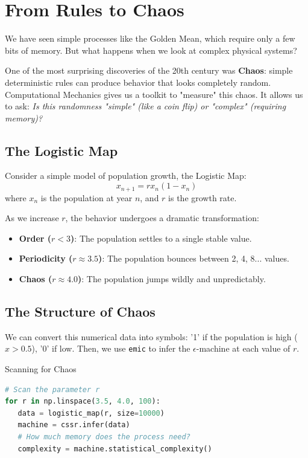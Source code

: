 \section{From Rules to Chaos}
\label{sec:chaos}

We have seen simple processes like the Golden Mean, which require only a few bits of memory. But what happens when we look at complex physical systems?

One of the most surprising discoveries of the 20th century was \textbf{Chaos}: simple deterministic rules can produce behavior that looks completely random. Computational Mechanics gives us a toolkit to "measure" this chaos. It allows us to ask: \textit{Is this randomness "simple" (like a coin flip) or "complex" (requiring memory)?}

\subsection{The Logistic Map}
Consider a simple model of population growth, the Logistic Map:
\[ x_{n+1} = r x_n (1 - x_n) \]
where $x_n$ is the population at year $n$, and $r$ is the growth rate.

As we increase $r$, the behavior undergoes a dramatic transformation:
\begin{itemize}
    \item \textbf{Order ($r < 3$)}: The population settles to a single stable value.
    \item \textbf{Periodicity ($r \approx 3.5$)}: The population bounces between 2, 4, 8... values.
    \item \textbf{Chaos ($r \approx 4.0$)}: The population jumps wildly and unpredictably.
\end{itemize}

\subsection{The Structure of Chaos}
We can convert this numerical data into symbols: '1' if the population is high ($x > 0.5$), '0' if low. Then, we use \texttt{emic} to infer the $\epsilon$-machine at each value of $r$.

\begin{emiclisting}[label=lst:chaos]{Scanning for Chaos}
\begin{lstlisting}[language=Python, basicstyle=\tiny\ttfamily, numbers=none]
# Scan the parameter r
for r in np.linspace(3.5, 4.0, 100):
   data = logistic_map(r, size=10000)
   machine = cssr.infer(data)
   # How much memory does the process need?
   complexity = machine.statistical_complexity()
\end{lstlisting}
\end{emiclisting}

